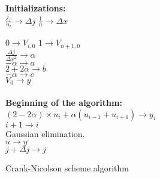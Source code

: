 \documentclass[a4paper, twoside, 11pt]{report}
\theoremstyle{theorem}
\theoremstyle{remark}
\theoremstyle{exemple}
\begin{document}
                    \begin{center}
                    \begin{algorithm}[H]

                    \SetAlgoLined

                         \\
                         \\
                          \\

                        \textbf{Initializations:}  \\
                            $\displaystyle \frac{j_f}{n_t} \rightarrow \Delta j$
                            $\displaystyle \frac{1}{n} \rightarrow \Delta x$

                            {
                                $0 \rightarrow V_{i,0}$
                            }
                            $1 \rightarrow V_{n+1,0}$  \\

                            $\displaystyle \frac{\Delta j}{\Delta x^2} \rightarrow \alpha$\\
                            $-\alpha \rightarrow a$\\
                            $2+2\alpha \rightarrow b$\\
                            $-\alpha \rightarrow c$\\
                            $V_0 \rightarrow y$\\
                            \ \\
                         \textbf{Beginning of the algorithm:} \\
                             {
                                    {
                                        $(2 - 2 \alpha) \times u_i + \alpha (u_{i-1}+u_{i+1}) \rightarrow y_i$ \\
                                        $i+1\rightarrow i$
                                    } \\
                                Gaussian elimination.\\
                                $u\rightarrow y$ \\
                                $j+\Delta j \rightarrow j$
                             }
                    \caption{Crank-Nicolson scheme algorithm}
                    \end{algorithm}
                    \end{center}
\end{document}
